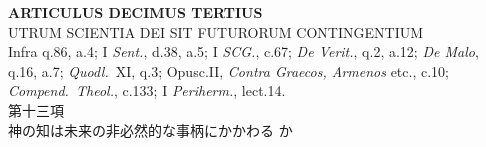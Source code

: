 \documentclass[paper=a4paper,fontsize=10pt,jafontsize=9pt,titlepage]{jlreq}
\begin{document}
\newpage



{}
\setcounter{section}{13}
\setcounter{subsection}{0}
\begin{center}
{\Large {\bfseries ARTICULUS DECIMUS TERTIUS}}\\ {\large UTRUM SCIENTIA DEI
SIT FUTURORUM CONTINGENTIUM}\\ {\footnotesize Infra q.86, a.4; I
{\itshape Sent.}, d.38, a.5; I {\itshape SCG.}, c.67; {\itshape De
Verit.}, q.2, a.12; {\itshape De Malo}, q.16, a.7; {\itshape
Quodl.}~XI, q.3; Opusc.II, {\itshape Contra Graecos, Armenos} etc.,
c.10; {\itshape Compend.~Theol.}, c.133; I {\itshape Periherm.},
lect.14.}\\ {\Large 第十三項\\神の知は未来の非必然的な事柄にかかわる
か}
\end{center}
\end{document}
